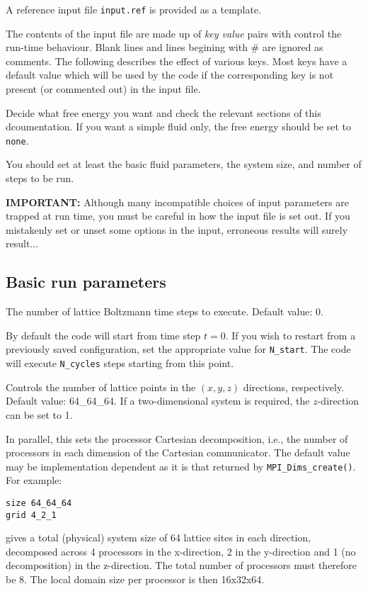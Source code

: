 A reference input file \texttt{input.ref} is provided as a template.

The contents of the input file are made up of \textit{key value}
pairs with control the run-time behaviour. Blank lines and lines
begining with \# are ignored as comments. The following describes
the effect of various keys. Most keys have a default value which
will be used by the code if the corresponding key is not present
(or commented out) in the input file.


Decide what free energy you want and check the relevant sections
of this dcoumentation. If you want a simple fluid only, the free
energy should be set to \texttt{none}.

You should set at least the basic fluid parameters, the system
size, and number of steps to be run.

\textbf{IMPORTANT:} Although many incompatible choices of input
parameters are trapped at run time, you must be careful in how
the input file is set out. If you mistakenly set or unset some
options in the input, erroneous results will surely result...


\subsection{Basic run parameters}


The number of lattice Boltzmann time steps to execute. Default
value: 0.


By default the code will start from time step $t = 0$. If you 
wish to restart from a previously saved configuration, set
the appropriate value for \texttt{N\_start}. The code will
execute \texttt{N\_cycles} steps starting from this point.


Controls the number of lattice points in the $(x, y, z)$ directions,
respectively. Default value: 64\_64\_64. If a two-dimensional system
is required, the $z$-direction can be set to 1.


In parallel, this sets the processor Cartesian decomposition, i.e.,
the number of processors in each dimension of the Cartesian communicator.
The default value may be implementation dependent as it is that returned
by \texttt{MPI\_Dims\_create()}. For
example:
\begin{verbatim}
size 64_64_64
grid 4_2_1
\end{verbatim}
gives a total (physical) system size of 64 lattice sites in each
direction, decomposed across 4 processors in the x-direction, 2 in
the y-direction and 1 (no decomposition) in the z-direction. The
total number of processors must therefore be 8. The local domain
size per processor is then 16x32x64.


